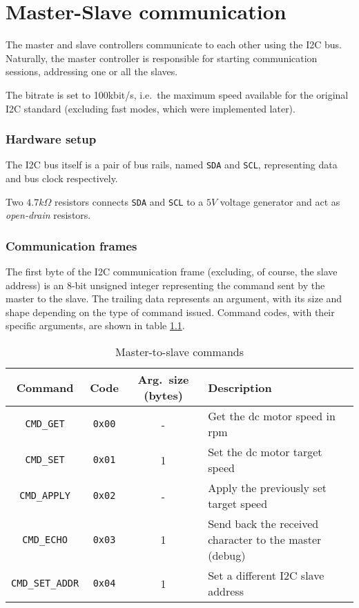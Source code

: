 \chapter{Master-Slave communication}
\label{ch:master-slave-comm}
The master and slave controllers communicate to each other using the I2C
bus. Naturally, the master controller is responsible for starting communication
sessions, addressing one or all the slaves.

The bitrate is set to 100kbit/s, i.e.\ the maximum speed available for the
original I2C standard\cite{i2c-ref} (excluding fast modes, which were
implemented later).

\subsection{Hardware setup}
The I2C bus itself is a pair of bus rails, named \texttt{SDA} and \texttt{SCL},
representing data and bus clock respectively.

Two $4.7 k\Omega$ resistors connects \texttt{SDA} and \texttt{SCL} to a $5V$
voltage generator and act as \emph{open-drain} resistors.

\subsection{Communication frames}
The first byte of the I2C communication frame (excluding, of course, the slave
address) is an 8-bit unsigned integer representing the command sent by the
master to the slave. The trailing data represents an argument, with its size
and shape depending on the type of command issued. Command codes, with their
specific arguments, are shown in table \ref{tab:i2c-commands}.

\begin{table}[bh]
  \begin{tabularx}{\textwidth}{c c c X}
    \toprule
    Command & Code & Arg.\ size (bytes) & Description \\
    \midrule
      \texttt{CMD\_GET}       & \texttt{0x00} & - & Get the dc motor speed in rpm \\
      \texttt{CMD\_SET}       & \texttt{0x01} & 1 & Set the dc motor target speed \\
      \texttt{CMD\_APPLY}     & \texttt{0x02} & - & Apply the previously set target speed \\
      \texttt{CMD\_ECHO}      & \texttt{0x03} & 1 & Send back the received character to the master (debug)\\
      \texttt{CMD\_SET\_ADDR} & \texttt{0x04} & 1 & Set a different I2C slave address \\
    \bottomrule
  \end{tabularx}
  \caption{Master-to-slave commands}
  \label{tab:i2c-commands}
\end{table}
